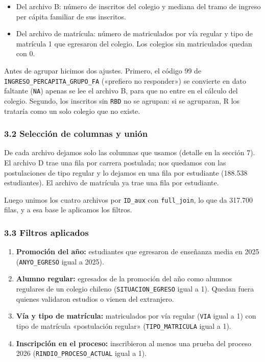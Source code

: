 \documentclass[11pt]{article}
\begin{document}
\begin{itemize}[leftmargin=1.5em, itemsep=0.3em]
  \item Del archivo B: número de inscritos del colegio y mediana del
        tramo de ingreso per cápita familiar de sus inscritos.
  \item Del archivo de matrícula: número de matriculados por vía regular y
        tipo de matrícula 1 que egresaron del colegio. Los colegios sin
        matriculados quedan con 0.
\end{itemize}

Antes de agrupar hicimos dos ajustes. Primero, el código 99 de
\texttt{INGRESO\_PERCAPITA\_GRUPO\_FA} («prefiero no responder») se
convierte en dato faltante (\texttt{NA}) apenas se lee el archivo B, para
que no entre en el cálculo del colegio. Segundo, los inscritos sin
\texttt{RBD} no se agrupan: si se agruparan, R los trataría como un solo
colegio que no existe.

\subsubsection*{3.2 \; Selección de columnas y unión}

De cada archivo dejamos solo las columnas que usamos (detalle en la
sección 7). El archivo D trae una fila por carrera postulada; nos quedamos con las
postulaciones de tipo regular y lo dejamos en una fila por estudiante
(188.538 estudiantes). El archivo de
matrícula ya trae una fila por estudiante.

Luego unimos los cuatro archivos por \texttt{ID\_aux} con
\texttt{full\_join}, lo que da 317.700 filas, y a esa base le aplicamos
los filtros.

\subsubsection*{3.3 \; Filtros aplicados}

\begin{enumerate}[leftmargin=1.5em, itemsep=0.3em, label=\textbf{\alph*)}]
  \item \textbf{Promoción del año:} estudiantes que egresaron de enseñanza
        media en 2025 (\texttt{ANYO\_EGRESO} igual a 2025).
  \item \textbf{Alumno regular:} egresados de la promoción del año como
        alumnos regulares de un colegio chileno
        (\texttt{SITUACION\_EGRESO} igual a 1). Quedan fuera quienes
        validaron estudios o vienen del extranjero.
  \item \textbf{Vía y tipo de matrícula:} matriculados por vía regular
        (\texttt{VIA} igual a 1) con tipo de matrícula «postulación
        regular» (\texttt{TIPO\_MATRICULA} igual a 1).
  \item \textbf{Inscripción en el proceso:} inscribieron al menos una
        prueba del proceso 2026 (\texttt{RINDIO\_PROCESO\_ACTUAL} igual
        a 1).
\end{enumerate}
\end{document}
